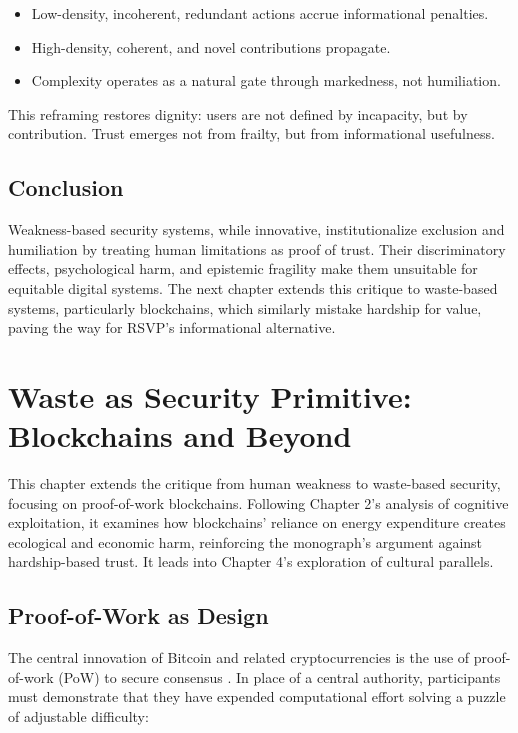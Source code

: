 \documentclass[openany]{book}
\begin{document}
\begin{itemize}
    \item Low-density, incoherent, redundant actions accrue informational penalties.
    \item High-density, coherent, and novel contributions propagate.
    \item Complexity operates as a natural gate through markedness, not humiliation.
\end{itemize}

This reframing restores dignity: users are not defined by incapacity, but by contribution. Trust emerges not from frailty, but from informational usefulness.

\section{Conclusion}

Weakness-based security systems, while innovative, institutionalize exclusion and humiliation by treating human limitations as proof of trust. Their discriminatory effects, psychological harm, and epistemic fragility make them unsuitable for equitable digital systems. The next chapter extends this critique to waste-based systems, particularly blockchains, which similarly mistake hardship for value, paving the way for RSVP’s informational alternative.

\chapter{Waste as Security Primitive:\\ Blockchains and Beyond}

This chapter extends the critique from human weakness to waste-based security, focusing on proof-of-work blockchains. Following Chapter 2’s analysis of cognitive exploitation, it examines how blockchains’ reliance on energy expenditure creates ecological and economic harm, reinforcing the monograph’s argument against hardship-based trust. It leads into Chapter 4’s exploration of cultural parallels.

\section{Proof-of-Work as Design}

The central innovation of Bitcoin and related cryptocurrencies is the use of proof-of-work (PoW) to secure consensus \cite{nakamoto2008}. In place of a central authority, participants must demonstrate that they have expended computational effort solving a puzzle of adjustable difficulty:
\end{document}
